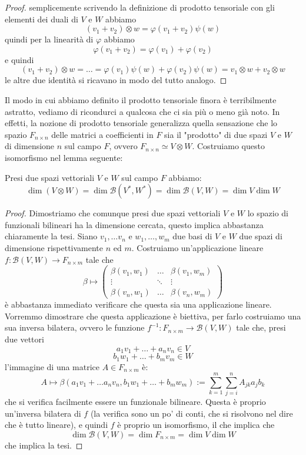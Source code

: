 \documentclass[11pt]{scrartcl}
\begin{document}
   	 \begin{proof}
   	 	semplicemente scrivendo la definizione di prodotto tensoriale con gli elementi dei duali di $V$ e $W$ abbiamo
   	 	$$\left(v_1+v_2\right)\otimes w = \varphi(v_1+v_2)\psi(w)$$
   	 	quindi per la linearità di $\varphi$ abbiamo
   	 	$$\varphi(v_1+v_2)=\varphi(v_1)+\varphi(v_2)$$
   	 	e quindi
   	 	$$\left(v_1+v_2\right)\otimes w=\dots = \varphi(v_1)\psi(w)+\varphi(v_2)\psi(w)= v_1\otimes w + v_2 \otimes w$$
   	 	le altre due identità si ricavano in modo del tutto analogo.
   	 \end{proof}
   	 Il modo in cui abbiamo definito il prodotto tensoriale finora è terribilmente astratto, vediamo di ricondurci a qualcosa che ci sia più o meno già noto. In effetti, la nozione di prodotto tensoriale generalizza quella sensazione che lo spazio $F_{n\times n}$ delle matrici a coefficienti in $F$ sia il "prodotto" di due spazi $V$ e $W$ di dimensione $n$ sul campo $F$, ovvero $F_{n\times n}\simeq V\otimes W$. Costruiamo questo isomorfismo nel lemma seguente:
   	 \begin{lemma}
   	 	Presi due spazi vettoriali $V$ e $W$ sul campo $F$ abbiamo:
   	 	$$\dim\left(V\otimes W\right)=\dim\mathcal{B}(V^*,W^*)=\dim\mathcal{B}(V,W)=\dim V \dim W$$
   	 \end{lemma}
   	 \begin{proof}
   	 	Dimostriamo che comunque presi due spazi vettoriali $V$ e $W$ lo spazio di funzionali bilineari ha la dimensione cercata, questo implica abbastanza chiaramente la tesi. Siano $v_1,\dots v_n$ e $w_1,\dots ,w_m$ due basi di $V$ e $W$ due spazi di dimensione rispettivamente $n$ ed $m$. Costruiamo un'applicazione lineare $f:\mathcal{B}(V,W)\to F_{n\times m}$ tale che 
   	 	$$\beta\mapsto 
   	 	\begin{pmatrix}
   	 		\beta(v_1,w_1) 	& \dots & \beta(v_1,w_m) \\
   	 		\vdots 			& \ddots& \vdots 		 \\
   	 		\beta(v_n,w_1)  & \dots & \beta(v_n,w_m)
   	 	\end{pmatrix}$$
   	 	è abbastanza immediato verificare che questa sia una applicazione lineare. Vorremmo dimostrare che questa applicazione è biettiva, per farlo costruiamo una sua inversa bilatera, ovvero le funzione $f^{-1}:F_{n\times m}\to \mathcal{B}(V,W)$ tale che, presi due vettori 
   	 	$$a_1v_1+\dots +a_nv_n \in V$$
   	 	$$b_1w_1+\dots +b_mv_m \in W$$
   	 	l'immagine di una matrice $A\in F_{n\times m}$ è:
   	 	$$A\mapsto \beta(a_1v_1+\dots a_nv_n,b_1w_1+\dots +b_mw_m):=\sum_{k=1}^{m}\sum_{j=i}^{n}A_{jk}a_jb_k$$
   	 	che si verifica facilmente essere un funzionale bilineare. Questa è proprio un'inversa bilatera di $f$ (la verifica sono un po' di conti, che si risolvono nel dire che è tutto lineare), e quindi $f$ è proprio un isomorfismo, il che implica che
   	 	$$\dim \mathcal{B}(V,W)=\dim F_{n\times m}=\dim V \dim W$$
   	 	che implica la tesi.
   	 \end{proof}
\end{document}
